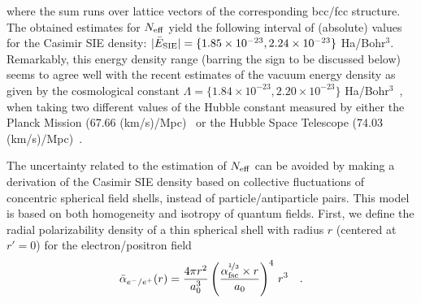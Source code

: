 \documentclass[aps,prl,twocolumn,showpacs,groupaddress]{revtex4-1}
\begin{document}
where the sum runs over lattice vectors of the corresponding bcc/fcc structure. The obtained estimates for $N_{\rm eff}$ yield
the following interval of (absolute) values for the Casimir SIE density: $|\bar{E}_{\rm SIE}|= \{1.85 \times 10^{-23}, 2.24 \times 10^{-23}\}$ Ha/Bohr$^3$. 
Remarkably, this energy density range (barring the sign to be discussed below)
seems to agree well with the recent estimates of the vacuum energy density as given by the cosmological constant $\Lambda = \{1.84 \times 10^{-23}, 2.20 \times 10^{-23}\}$ Ha/Bohr$^3$~\cite{Astroconstants}, when taking two different values of the Hubble constant measured by either the Planck Mission (67.66 (km/s)/Mpc)~\cite{Planck} or the Hubble Space Telescope (74.03 (km/s)/Mpc)~\cite{Hubble}. 


The uncertainty related to the estimation of $N_{\rm eff}$ can be avoided by making a derivation of the Casimir SIE density based on collective fluctuations of concentric spherical field shells, instead of particle/antiparticle pairs. This model is based on both homogeneity and isotropy of quantum fields. First, we define the radial polarizability density of a thin spherical shell with radius $r$ (centered at $r' = 0$) for the electron/positron field
\begin{equation}
\label{eqRadPol}
\bar{\alpha}_{e^-/e^+}(r) = \frac{4 \pi r^2}{a_0^3} \left(\frac{\alpha_{\rm fsc}^{\nicefrac{1}{3}} \times r}{a_0}\right)^4\, r^3 \quad . 
\end{equation}
\end{document}
